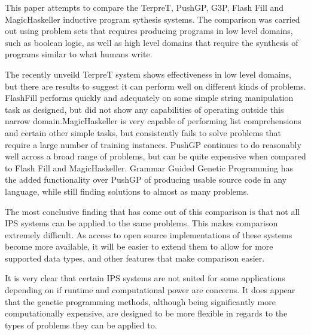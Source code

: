 This paper attempts to compare the TerpreT, PushGP, G3P, Flash Fill and MagicHaskeller inductive program sythesis systems. The comparison was carried out using problem sets that requires producing programs in low level domains, such as boolean logic, as well as high level domains that require the synthesis of programs similar to what humans write.

The recently unveild TerpreT system shows effectiveness in low level domains, but there are results to suggest it can perform well on different kinds of problems. FlashFill performs quickly and adequately on some simple string manipulation task as designed, but did not show any capabilities of operating outside this narrow domain.MagicHaskeller is very capable of performing list comprehensions and certain other simple tasks, but consistently fails to solve problems that require a large number of training instances. PushGP continues to do reasonably well across a broad range of problems, but can be quite expensive when compared to Flash Fill and MagicHaskeller. Grammar Guided Genetic Programming has the added functionality over PushGP of producing usable source code in any language, while still finding solutions to almost as many problems.

The most conclusive finding that has come out of this comparison is that not all IPS systems can be applied to the same problems. This makes comparison extremely difficult. As access to open source implementations of these systems become more available, it will be easier to extend them to allow for more supported data types, and other features that make comparison easier.

It is very clear that certain IPS systems are not suited for some applications depending on if runtime and computational power are concerns. It does appear that the genetic programming methods, although being significantly more computationally expensive, are designed to be more flexible in regards to the types of problems they can be applied to.

